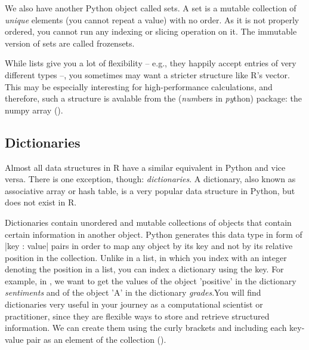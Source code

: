 



We also have another Python object called sets. A set is a mutable
collection of \emph{unique} elements (you cannot repeat a value) with
no order. As it is not properly ordered, you cannot run any indexing
or slicing operation on it. The immutable version of sets are called
frozensets.



While lists give you a lot of flexibility -- e.g., they happily accept
entries of very different types --, you sometimes may want a stricter
structure like R's vector. This may be especially interesting for
high-performance calculations, and therefore, such a structure is
avalable from the  (\emph{num}bers in \emph{py}thon)
package: the numpy array ().




\subsection{Dictionaries}
Almost all data structures in R have a similar equivalent in Python
and vice versa. There is one exception, though: \emph{dictionaries}. A
dictionary, also known as associative array or hash table, is a very
popular data structure in Python, but does not exist in R.

Dictionaries contain unordered and mutable collections of objects that
contain certain information in another object. Python generates this
data type in form of |{key : value}| pairs in order
to map any object by its key and not by its relative position in the
collection. Unlike in a list, in which you index with an integer denoting
the position in a list, you can index a dictionary using the key.
For example, in , we want to get the values of the object 'positive' in the
dictionary \emph{sentiments} and of the object 'A' in the dictionary
\emph{grades}.You will
find dictionaries very useful in your journey as a computational
scientist or practitioner, since they are flexible ways to store and
retrieve structured information. We can create them using the curly
brackets {} and including each key-value pair as an element of the
collection ().

